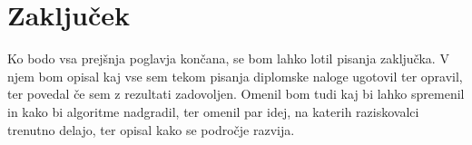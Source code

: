 \chapter{Zaključek}

Ko bodo vsa prejšnja poglavja končana, se bom lahko lotil pisanja zaključka. V njem bom opisal kaj vse sem tekom pisanja diplomske naloge ugotovil ter opravil, ter povedal če sem z rezultati zadovoljen. Omenil bom tudi kaj bi lahko spremenil in kako bi algoritme nadgradil, ter omenil par idej, na katerih raziskovalci trenutno delajo, ter opisal kako se področje razvija. 
